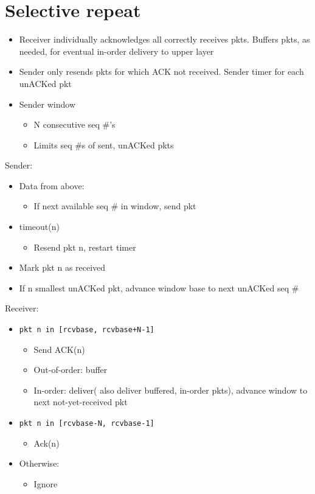 \documentclass{article}[18pt]
\begin{document}
\section{Selective repeat}
\begin{itemize}
	\item Receiver individually acknowledges all correctly receives pkts. Buffers pkts, as needed, for eventual in-order delivery to upper layer
	\item Sender only resends pkts for which ACK not received. Sender timer for each unACKed pkt
	\item Sender window
	\begin{itemize}
		\item N consecutive seq \#'s
		\item Limits seq \#s of sent, unACKed pkts
	\end{itemize}
\end{itemize}
Sender:
\begin{itemize}
	\item Data from above:
	\begin{itemize}
		\item If next available seq \# in window, send pkt
	\end{itemize}
	\item timeout(n)
	\begin{itemize}
		\item Resend pkt n, restart timer
	\end{itemize}
	\item Mark pkt n as received
	\item If n smallest unACKed pkt, advance window base to next unACKed seq \#
\end{itemize}
Receiver:
\begin{itemize}
	\item \texttt{pkt n in [rcvbase, rcvbase+N-1]}
	\begin{itemize}
	\item Send ACK(n)
	\item Out-of-order: buffer
	\item In-order: deliver( also deliver buffered, in-order pkts), advance window to next not-yet-received pkt
	\end{itemize}
	\item \texttt{pkt n in [rcvbase-N, rcvbase-1]}
	\begin{itemize}
		\item Ack(n)
	\end{itemize}
	\item Otherwise:
	\begin{itemize}
		\item Ignore
	\end{itemize} 
\end{itemize}
\end{document}
